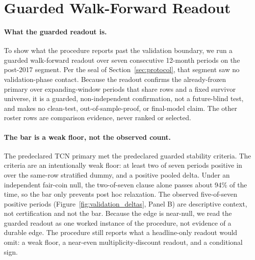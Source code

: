 \section{Guarded Walk-Forward Readout}\label{sec:guarded}

\paragraph{What the guarded readout is.}
To show what the procedure reports past the validation boundary, we run a
guarded walk-forward readout over seven consecutive
12-month periods on the post-2017 segment. Per the seal of
Section~\ref{sec:protocol}, that segment saw no validation-phase contact.
Because the readout confirms the already-frozen primary over expanding-window
periods that share rows and a fixed survivor universe, it is a guarded,
non-independent confirmation, not a future-blind test, and makes no clean-test,
out-of-sample-proof, or final-model claim. The other roster rows are comparison
evidence, never ranked or selected.

\paragraph{The bar is a weak floor, not the observed count.}
The predeclared TCN primary met the predeclared guarded stability criteria.
The criteria are an intentionally weak floor: at least two of seven periods
positive in \macrofone{} over the same-row stratified dummy, and a positive
pooled delta. Under an independent fair-coin null, the two-of-seven clause alone
passes about 94\% of the time, so the bar only prevents post hoc relaxation.
The observed five-of-seven positive periods
(Figure~\ref{fig:validation_deltas}, Panel B) are descriptive context, not
certification and not the bar. Because the edge is near-null, we read the guarded
readout as one worked instance of the procedure, not evidence of a durable edge.
The procedure still reports what a headline-only readout would omit: a weak
floor, a near-even multiplicity-discount readout, and a conditional sign.

